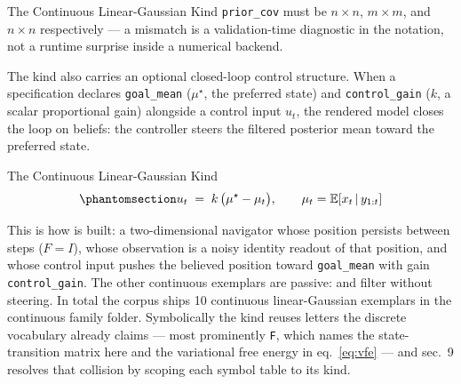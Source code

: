 \documentclass[
  ignorenonframetext,
]{beamer}
\begin{document}
\begin{frame}{The Continuous Linear-Gaussian
Kind}
\texttt{prior\_cov} must be \(n \times n\), \(m \times m\), and
\(n \times n\) respectively --- a mismatch is a validation-time
diagnostic in the notation, not a runtime surprise inside a numerical
backend.

The kind also carries an optional closed-loop control structure. When a
specification declares \texttt{goal\_mean} (\(\mu^\star\), the preferred
state) and \texttt{control\_gain} (\(k\), a scalar proportional gain)
alongside a control input \(u_t\), the rendered model closes the loop on
beliefs: the controller steers the filtered posterior mean toward the
preferred state.

\end{frame}

\begin{frame}{The Continuous Linear-Gaussian
Kind}
\begin{equation}\protect\phantomsection\label{eq:closed_loop}{u_t \;=\; k \,\bigl(\mu^\star - \mu_t\bigr), \qquad \mu_t = \mathbb{E}\!\left[x_t \,\middle|\, y_{1:t}\right]}\end{equation}

This is how
 is built:
a two-dimensional navigator whose position persists between steps
(\(F = I\)), whose observation is a noisy identity readout of that
position, and whose control input pushes the believed position toward
\texttt{goal\_mean} with gain \texttt{control\_gain}. The other
continuous exemplars are passive: 
and  filter without steering. In total
the corpus ships 10 continuous linear-Gaussian exemplars in the
continuous family folder. Symbolically the kind reuses letters the
discrete vocabulary already claims --- most prominently \texttt{F},
which names the state-transition matrix here and the variational free
energy in eq.~\ref{eq:vfe} --- and sec.~9
resolves that collision by scoping each symbol table to its kind.
\end{frame}
\end{document}
